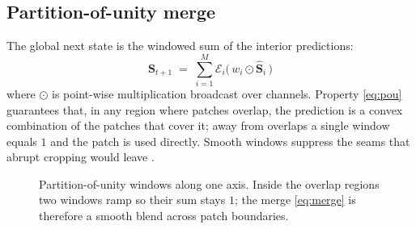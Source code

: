 \documentclass[11pt]{article}
\newcommand{\Eop}{\mathcal{E}}
\begin{document}
\subsection{Partition-of-unity merge}
The global next state is the windowed sum of the interior predictions:
\begin{equation}
\boxed{\;\bm S_{t+1} \;=\; \sum_{i=1}^{M} \Eop_i\!\big(\, w_i \odot \hat{\bm S}_i \,\big)\;}
\label{eq:merge}
\end{equation}
where $\odot$ is point-wise multiplication broadcast over channels. Property
\eqref{eq:pou} guarantees that, in any region where patches overlap, the
prediction is a convex combination of the patches that cover it; away from
overlaps a single window equals $1$ and the patch is used directly. Smooth
windows suppress the seams that abrupt cropping would leave
\cite{ronneberger2015unet,bartal2023multidiffusion}.

\begin{figure}[t]
\centering
{}
\caption{Partition-of-unity windows along one axis. Inside the overlap regions
two windows ramp so their sum stays $1$; the merge \eqref{eq:merge} is therefore
a smooth blend across patch boundaries.}
\label{fig:pou}
\end{figure}
\end{document}
